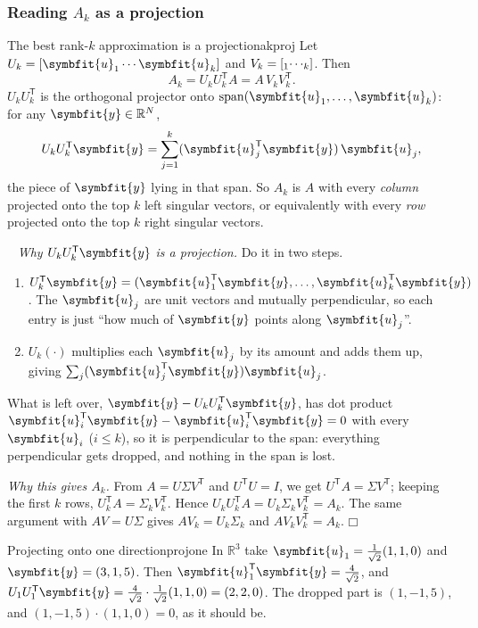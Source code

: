 \documentclass[11pt]{article}
\newcommand{\bm}[1]{\symbfit{#1}}
\newenvironment{proofsketch}{\par\noindent{\itshape Proof.}\ }{\hfill$\mdlgwhtsquare$\par}
\newcommand{\R}{\mathbb{R}}
\let\vv\relax\newcommand{\vv}{\bm{v}}
\newcommand{\vu}{\bm{u}}
\newcommand{\T}{^{\mathsf T}}
\newcommand{\spn}{\operatorname{span}}
\begin{document}
\subsubsection*{Reading $A_k$ as a projection}

\begin{proposition}{The best rank-$k$ approximation is a projection}{akproj}
Let $U_k=[\vu_1\cdots\vu_k]$ and $V_k=[\vv_1\cdots\vv_k]$. Then
\[
A_k=U_kU_k\T A=A\,V_kV_k\T .
\]
$U_kU_k\T$ is the orthogonal projector onto $\spn(\vu_1,\dots,\vu_k)$: for any $\bm y\in\R^N$,
\[
U_kU_k\T\bm y=\sum_{j=1}^k(\vu_j\T\bm y)\,\vu_j ,
\]
the piece of $\bm y$ lying in that span. So $A_k$ is $A$ with every \emph{column} projected onto the top $k$ left singular vectors,
or equivalently with every \emph{row} projected onto the top $k$ right singular vectors.
\end{proposition}
\begin{proofsketch}
\emph{Why $U_kU_k\T\bm y$ is a projection.} Do it in two steps.
\begin{enumerate}[nosep,label=\arabic*)]
\item $U_k\T\bm y=(\vu_1\T\bm y,\dots,\vu_k\T\bm y)$. The $\vu_j$ are unit vectors and mutually perpendicular, so each entry is just ``how much
of $\bm y$ points along $\vu_j$''.
\item $U_k(\cdot)$ multiplies each $\vu_j$ by its amount and adds them up, giving $\sum_j(\vu_j\T\bm y)\vu_j$.
\end{enumerate}
What is left over, $\bm y-U_kU_k\T\bm y$, has dot product $\vu_i\T\bm y-\vu_i\T\bm y=0$ with every $\vu_i$ ($i\le k$), so it is
perpendicular to the span: everything perpendicular gets dropped, and nothing in the span is lost.

\emph{Why this gives $A_k$.} From $A=U\Sigma V\T$ and $U\T U=I$, we get $U\T A=\Sigma V\T$; keeping the first $k$ rows,
$U_k\T A=\Sigma_kV_k\T$. Hence $U_kU_k\T A=U_k\Sigma_kV_k\T=A_k$. The same argument with $AV=U\Sigma$ gives $AV_k=U_k\Sigma_k$ and
$AV_kV_k\T=A_k$.
\end{proofsketch}

\begin{example}{Projecting onto one direction}{projone}
In $\R^3$ take $\vu_1=\tfrac1{\sqrt2}(1,1,0)$ and $\bm y=(3,1,5)$. Then $\vu_1\T\bm y=\tfrac4{\sqrt2}$, and
$U_1U_1\T\bm y=\tfrac4{\sqrt2}\cdot\tfrac1{\sqrt2}(1,1,0)=(2,2,0)$. The dropped part is $(1,-1,5)$, and $(1,-1,5)\cdot(1,1,0)=0$, as it should be.
\end{example}
\end{document}

